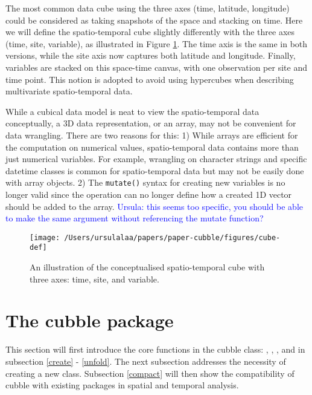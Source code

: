 \documentclass{article}
\begin{document}
The most common data cube using the three axes (time, latitude, longitude) could be considered as taking snapshots of the space and stacking on time. Here we will define the spatio-temporal cube slightly differently with the three axes (time, site, variable), as illustrated in Figure \ref{fig:cube-def}. The time axis is the same in both versions, while the site axis now captures both latitude and longitude. Finally, variables are stacked on this space-time canvas, with one observation per site and time point. This notion is adopted to avoid using hypercubes when describing multivariate spatio-temporal data.

While a cubical data model is neat to view the spatio-temporal data conceptually, a 3D data representation, or an array, may not be convenient for data wrangling. There are two reasons for this: 1) While arrays are efficient for the computation on numerical values, spatio-temporal data contains more than just numerical variables. For example, wrangling on character strings and specific datetime classes is common for spatio-temporal data but may not be easily done with array objects. 2) The \texttt{mutate()} syntax for creating new variables is no longer valid since the operation can no longer define how a created 1D vector should be added to the array.
\textcolor{blue}{Ursula: this seems too specific, you should be able to make the same argument without referencing the mutate function?}

\begin{figure}

{\centering \texttt{[image: /Users/ursulalaa/papers/paper-cubble/figures/cube-def]} 

}

\caption{An illustration of the conceptualised spatio-temporal cube with three axes: time, site, and variable.}\label{fig:cube-def}
\end{figure}

\hypertarget{cubble}{%
\section{The cubble package}\label{cubble}}

This section will first introduce the core functions in the cubble class: , , , and  in subsection \ref{create} - \ref{unfold}. The next subsection addresses the necessity of creating a new class. Subsection \ref{compact} will then show the compatibility of cubble with existing packages in spatial and temporal analysis.
\end{document}
